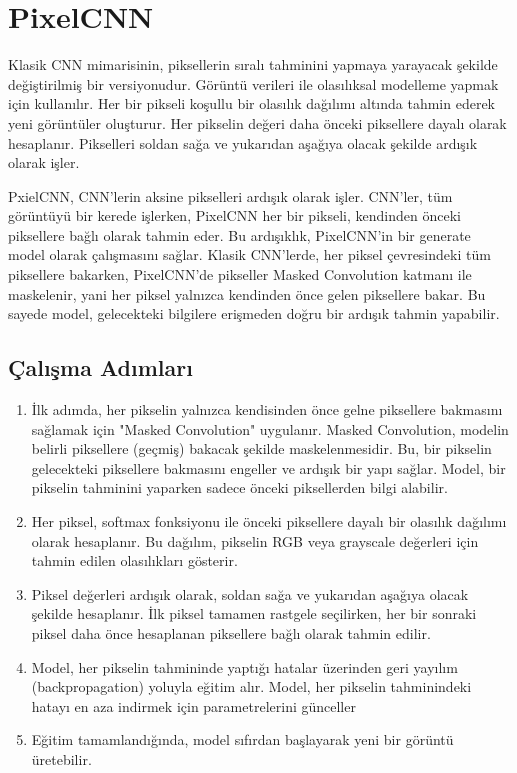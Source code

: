 \section{PixelCNN}

Klasik CNN mimarisinin, piksellerin sıralı tahminini yapmaya yarayacak şekilde değiştirilmiş bir versiyonudur. Görüntü verileri ile olasılıksal modelleme yapmak için kullanılır. Her bir pikseli koşullu bir olasılık dağılımı altında tahmin ederek yeni görüntüler oluşturur. Her pikselin değeri daha önceki piksellere dayalı olarak hesaplanır. Pikselleri soldan sağa ve yukarıdan aşağıya olacak şekilde ardışık olarak işler.

PxielCNN, CNN'lerin aksine pikselleri ardışık olarak işler. CNN'ler, tüm görüntüyü bir kerede işlerken, PixelCNN her bir pikseli, kendinden önceki piksellere bağlı olarak tahmin eder. Bu ardışıklık, PixelCNN'in bir generate model olarak çalışmasını sağlar. Klasik CNN'lerde, her piksel çevresindeki tüm piksellere bakarken, PixelCNN'de pikseller Masked Convolution katmanı ile maskelenir, yani her piksel yalnızca kendinden önce gelen piksellere bakar. Bu sayede model, gelecekteki bilgilere erişmeden doğru bir ardışık tahmin yapabilir.

\subsection{Çalışma Adımları}

\begin{enumerate}
    \item İlk adımda, her pikselin yalnızca kendisinden önce gelne piksellere bakmasını sağlamak için "Masked Convolution" uygulanır. Masked Convolution, modelin belirli piksellere (geçmiş) bakacak şekilde maskelenmesidir. Bu, bir pikselin gelecekteki piksellere bakmasını engeller ve ardışık bir yapı sağlar. Model, bir pikselin tahminini yaparken sadece önceki piksellerden bilgi alabilir.
    \item Her piksel, softmax fonksiyonu ile önceki piksellere dayalı bir olasılık dağılımı olarak hesaplanır. Bu dağılım, pikselin RGB veya grayscale değerleri için tahmin edilen olasılıkları gösterir.
    \item Piksel değerleri ardışık olarak, soldan sağa ve yukarıdan aşağıya olacak şekilde hesaplanır. İlk piksel tamamen rastgele seçilirken, her bir sonraki piksel daha önce hesaplanan piksellere bağlı olarak tahmin edilir.
    \item Model, her pikselin tahmininde yaptığı hatalar üzerinden geri yayılım (backpropagation) yoluyla eğitim alır. Model, her pikselin tahminindeki hatayı en aza indirmek için parametrelerini günceller
    \item Eğitim tamamlandığında, model sıfırdan başlayarak yeni bir görüntü üretebilir.
\end{enumerate}

